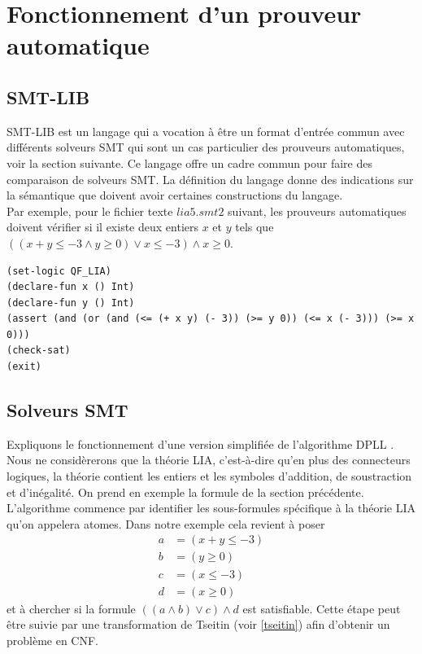 \documentclass[11pt]{article}
\begin{document}
\newpage
\section{Fonctionnement d'un prouveur automatique} \label{fonctionnement_prouveurs}

\subsection{SMT-LIB}\label{smt-lib}

SMT-LIB est un langage qui a vocation à être un format d'entrée commun avec différents solveurs SMT qui sont un cas particulier des prouveurs automatiques, voir la section suivante. Ce langage offre un cadre commun pour faire des comparaison de solveurs SMT. La définition du langage \cite{smtlib} donne des indications sur la sémantique que doivent avoir certaines constructions du langage.\\

Par exemple, pour le fichier texte $lia5.smt2$ suivant, les prouveurs automatiques doivent vérifier si il existe deux entiers $x$ et $y$ tels que $ ((x + y \leq -3 \wedge y \geq 0) \vee x \leq -3) \wedge x \geq 0$.    
\begin{lstlisting}[frame=single]
(set-logic QF_LIA)
(declare-fun x () Int)
(declare-fun y () Int)
(assert (and (or (and (<= (+ x y) (- 3)) (>= y 0)) (<= x (- 3))) (>= x 0)))
(check-sat)
(exit)
\end{lstlisting}

\subsection{Solveurs SMT} \label{smt}

Expliquons le fonctionnement d'une version simplifiée de l'algorithme DPLL \cite{dpll}. Nous ne considèrerons que la théorie LIA, c'est-à-dire qu'en plus des connecteurs logiques, la théorie contient les entiers et les symboles d'addition, de soustraction et d'inégalité. On prend en exemple la formule de la section précédente. L'algorithme commence par identifier les sous-formules spécifique à la théorie LIA qu'on appelera atomes. Dans notre exemple cela revient à poser
\begin{align*}
  a &= (x + y \leq -3)\\
  b &= (y \geq 0)\\
  c &= (x \leq -3) \\
  d &= (x \geq 0)
\end{align*}
et à chercher si la formule  $((a \wedge b) \vee c) \wedge d$ est satisfiable. Cette étape peut être suivie par une transformation de Tseitin (voir \ref{tseitin}) afin d'obtenir un problème en CNF. \\
\end{document}
